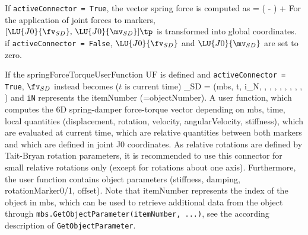     If \texttt{activeConnector = True}, the vector spring force is computed as
    \be
       = \kv \left(  - \right) + 
            \dv {}
    \ee
    For the application of joint forces to markers, $[\LU{J0}{\fv_{SD}},\,\LU{J0}{\mv_{SD}}]\tp$ is transformed into global coordinates.
    if \texttt{activeConnector = False}, $\LU{J0}{\fv_{SD}}$ and  $\LU{J0}{\mv_{SD}}$ are set to zero.

    If the springForceTorqueUserFunction $\mathrm{UF}$ is defined and \texttt{activeConnector = True}, 
	$\fv_{SD}$ instead becomes ($t$ is current time)
    \be
      \fv_{SD} = (mbs, t, i_N, , , , , 
	                         , , , , )
    \ee
    and \texttt{iN} represents the itemNumber (=objectNumber).
    A user function, which computes the 6D spring-damper force-torque vector depending on mbs, time, local quantities 
	(displacement, rotation, velocity, angularVelocity, stiffness), which are evaluated at current time, which are relative quantities between 
	both markers and which are defined in joint J0 coordinates. 
	As relative rotations are defined by Tait-Bryan rotation parameters, it is recommended to use this connector for small relative rotations only 
	(except for rotations about one axis).
	Furthermore, the user function contains object parameters (stiffness, damping, rotationMarker0/1, offset).
    Note that itemNumber represents the index of the object in mbs, which can be used to retrieve additional data from the object through
    \texttt{mbs.GetObjectParameter(itemNumber, ...)}, see the according description of \texttt{GetObjectParameter}.
    
